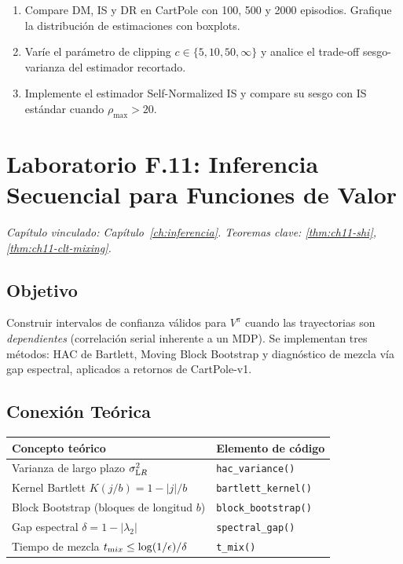 \begin{enumerate}
    \item Compare DM, IS y DR en CartPole con 100, 500 y 2000 episodios.
          Grafique la distribución de estimaciones con boxplots.
    \item Varíe el parámetro de clipping $c \in \{5, 10, 50, \infty\}$
          y analice el trade-off sesgo-varianza del estimador recortado.
    \item Implemente el estimador Self-Normalized IS y compare su sesgo
          con IS estándar cuando $\rho_{\max} > 20$.
\end{enumerate}

\section{Laboratorio F.11: Inferencia Secuencial para Funciones de Valor}
\label{lab:F11}
\textit{Capítulo vinculado: Capítulo~\ref{ch:inferencia}.
Teoremas clave: \ref{thm:ch11-shi}, \ref{thm:ch11-clt-mixing}.}

\bigskip

\subsection*{Objetivo}

Construir intervalos de confianza válidos para $V^\pi$ cuando las trayectorias
son \emph{dependientes} (correlación serial inherente a un MDP). Se implementan
tres métodos: HAC de Bartlett, Moving Block Bootstrap y diagnóstico de mezcla
vía gap espectral, aplicados a retornos de CartPole-v1.

\subsection*{Conexión Teórica}

\begin{center}
\small
\begin{tabular}{ll}
\toprule
\textbf{Concepto teórico} & \textbf{Elemento de código} \\
\midrule
Varianza de largo plazo $\sigma^2_{\textrm LR}$ & \texttt{hac\_variance()} \\
Kernel Bartlett $K(j/b) = 1 - |j|/b$ & \texttt{bartlett\_kernel()} \\
Block Bootstrap (bloques de longitud $b$) & \texttt{block\_bootstrap()} \\
Gap espectral $\delta = 1 - |\lambda_2|$ & \texttt{spectral\_gap()} \\
Tiempo de mezcla $t_{\textrm mix} \leq \log(1/\epsilon)/\delta$ & \texttt{t\_mix()} \\
\bottomrule
\end{tabular}
\end{center}

